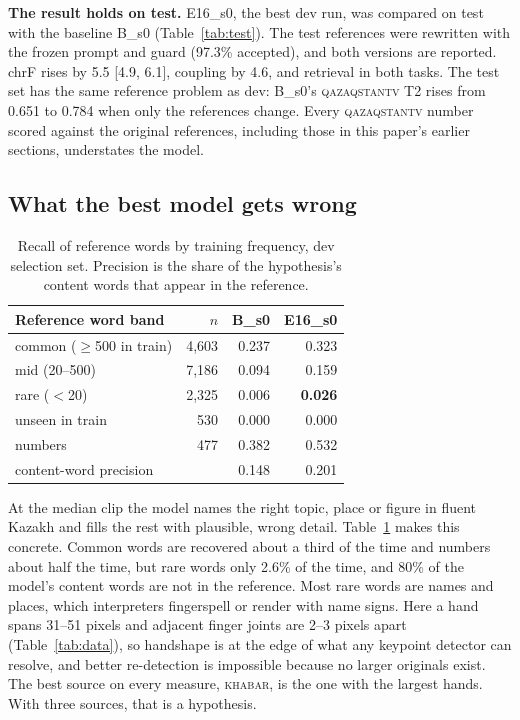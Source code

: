 \documentclass[11pt,twocolumn,a4paper]{article}
\newcommand{\src}[1]{\textsc{#1}}
\newcommand{\kh}{\src{khabar}}
\newcommand{\qz}{\src{qazaqstantv}}
\renewcommand{\paragraph}[1]{\par\smallskip\noindent\textbf{#1}\hspace{0.5em}}
\begin{document}
\paragraph{The result holds on test.}
E16\_s0, the best dev run, was compared on test with the baseline B\_s0 (Table~\ref{tab:test}). The test references were rewritten with the frozen prompt and guard (97.3\% accepted), and both versions are reported. chrF rises by 5.5 [4.9, 6.1], coupling by 4.6, and retrieval in both tasks. The test set has the same reference problem as dev: B\_s0's \qz{} T2 rises from 0.651 to 0.784 when only the references change. Every \qz{} number scored against the original references, including those in this paper's earlier sections, understates the model.

\subsection{What the best model gets wrong}
\label{sec:errors}

\begin{table}[t]
\centering\small
\setlength{\tabcolsep}{5pt}
\begin{tabular}{lrrr}
\toprule
Reference word band & $n$ & B\_s0 & E16\_s0 \\
\midrule
common ($\geq$500 in train) & 4{,}603 & 0.237 & 0.323 \\
mid (20--500) & 7{,}186 & 0.094 & 0.159 \\
rare ($<$20) & 2{,}325 & 0.006 & \textbf{0.026} \\
unseen in train & 530 & 0.000 & 0.000 \\
numbers & 477 & 0.382 & 0.532 \\
\midrule
content-word precision & & 0.148 & 0.201 \\
\bottomrule
\end{tabular}
\caption{Recall of reference words by training frequency, dev selection set. Precision is the share of the hypothesis's content words that appear in the reference.}
\label{tab:bands}
\end{table}

At the median clip the model names the right topic, place or figure in fluent Kazakh and fills the rest with plausible, wrong detail. Table~\ref{tab:bands} makes this concrete. Common words are recovered about a third of the time and numbers about half the time, but rare words only 2.6\% of the time, and 80\% of the model's content words are not in the reference. Most rare words are names and places, which interpreters fingerspell or render with name signs. Here a hand spans 31--51 pixels and adjacent finger joints are 2--3 pixels apart (Table~\ref{tab:data}), so handshape is at the edge of what any keypoint detector can resolve, and better re-detection is impossible because no larger originals exist. The best source on every measure, \kh, is the one with the largest hands. With three sources, that is a hypothesis.
\end{document}
